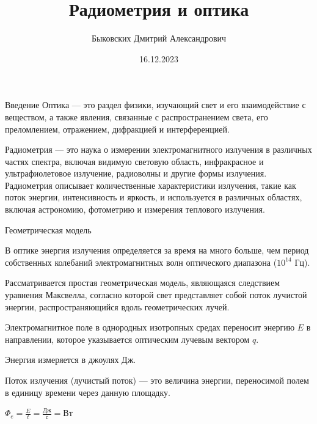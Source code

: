 \documentclass{beamer}
\title[Радиометрия]{Радиометрия и оптика}
\author[Быковских Д.А.]{Быковских Дмитрий Александрович}
\date{16.12.2023}
\begin{document}
	\begin{frame}
		\titlepage
	\end{frame}
	\begin{frame}{Введение}
		Оптика --- это раздел физики, изучающий свет и его взаимодействие с веществом, а также явления, связанные с распространением света, его преломлением, отражением, дифракцией и интерференцией.

		Радиометрия --- это наука о измерении электромагнитного излучения в различных частях спектра, включая видимую световую область, инфракрасное и ультрафиолетовое излучение, радиоволны и другие формы излучения. Радиометрия описывает количественные характеристики излучения, такие как поток энергии, интенсивность и яркость, и используется в различных областях, включая астрономию, фотометрию и измерения теплового излучения.
	\end{frame}

	\begin{frame}{Геометрическая модель} %

		В оптике энергия излучения определяется за время на много больше, чем период собственных колебаний электромагнитных волн оптического диапазона ($10^14$ Гц).

		Рассматривается простая геометрическая модель, являющаяся следствием уравнения Максвелла, согласно которой
		свет представляет собой поток лучистой энергии, распространяющийся вдоль геометрических лучей.

		Электромагнитное поле в однородных изотропных средах переносит энергию $E$ в направлении, которое указывается оптическим лучевым вектором $q$.

		Энергия измеряется в джоулях Дж.

		Поток излучения (лучистый поток) ---  это величина энергии, переносимой полем в единицу времени через данную площадку.

		$\Phi_e = \frac{E}{t} = \frac{\text{Дж}}{\text{с}} = \text{Вт}$


	\end{frame}
\end{document}

